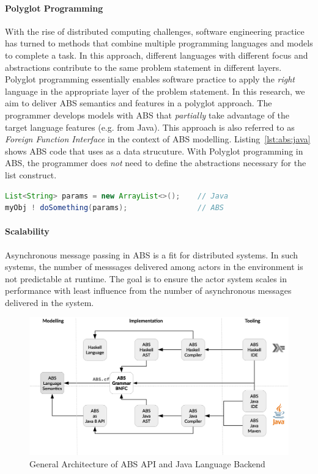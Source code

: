 \paragraph{Polyglot Programming}
With the rise of distributed computing challenges, software engineering practice has turned to methods that combine multiple programming languages and models to complete a task. 
In this approach, different languages with different focus and abstractions contribute to the same problem statement in different layers. 
Polyglot programming essentially enables software practice to apply the \emph{right} language in the appropriate layer of the problem statement. 
In this research, we aim to deliver ABS semantics and features in a polyglot approach. 
The programmer develops models with ABS that \emph{partially} take advantage of the target language features (e.g. from Java).
This approach is also referred to as \emph{Foreign Function Interface} in the context of ABS modelling.
Listing~\ref{lst:abs:java} shows ABS code that uses  as a data strucuture.
With Polyglot programming in ABS, the programmer does \emph{not} need to define the abstractions necessary for the list construct. 

\begin{lstlisting}[float=h,language=Java,caption=Using Java in ABS,label=lst:abs:java]
List<String> params = new ArrayList<>();    // Java
myObj ! doSomething(params);                // ABS
\end{lstlisting}

\paragraph{Scalability} 
Asynchronous message passing in ABS is a fit for distributed systems.
In such systems, the number of messsages delivered among actors in the 
environment is not predictable at runtime.
The goal is to ensure the actor system scales in performance with least 
influence from the number of asynchronous messages delivered in the system.

\begin{figure}[t]
\centering
\includegraphics[scale=0.3]{../figs/Arch.eps}
\caption[General Architecture]{General Architecture of ABS API and Java Language Backend}
\label{fig:arch}
\end{figure}

